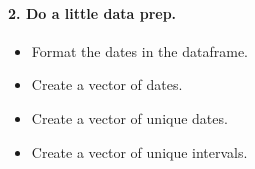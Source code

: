 \documentclass[]{article}
\newenvironment{Shaded}{\begin{snugshade}}{\end{snugshade}}
\newcommand{\KeywordTok}[1]{\textcolor[rgb]{0.13,0.29,0.53}{\textbf{#1}}}
\newcommand{\StringTok}[1]{\textcolor[rgb]{0.31,0.60,0.02}{#1}}
\newcommand{\OperatorTok}[1]{\textcolor[rgb]{0.81,0.36,0.00}{\textbf{#1}}}
\newcommand{\NormalTok}[1]{#1}
\providecommand{\tightlist}{%
  \setlength{\itemsep}{0pt}\setlength{\parskip}{0pt}}
\let\oldparagraph\paragraph
\renewcommand{\paragraph}[1]{\oldparagraph{#1}\mbox{}}
\begin{document}
\paragraph{2. Do a little data prep.}\label{do-a-little-data-prep.}

\begin{itemize}
\tightlist
\item
  Format the dates in the dataframe.
\end{itemize}

\begin{Shaded}
\end{Shaded}

\begin{itemize}
\tightlist
\item
  Create a vector of dates.
\end{itemize}

\begin{Shaded}
\end{Shaded}

\begin{itemize}
\tightlist
\item
  Create a vector of unique dates.
\end{itemize}

\begin{Shaded}
\end{Shaded}

\begin{itemize}
\tightlist
\item
  Create a vector of unique intervals.
\end{itemize}

\begin{Shaded}
\end{Shaded}
\end{document}
